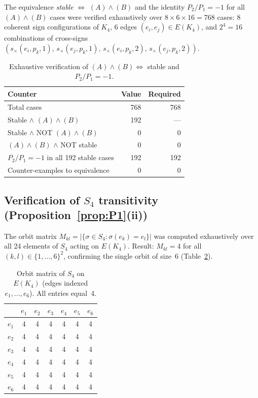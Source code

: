 \documentclass[11pt,a4paper]{article}
\theoremstyle{definition}
\begin{document}
The equivalence \emph{stable} $\iff$ $(A)\wedge(B)$ and the identity $P_2/P_1 = -1$ for all $(A)\wedge(B)$ cases were verified exhaustively over $8\times 6\times 16 = 768$ cases: 8 coherent sign configurations of $K_4$, 6 edges $(e_i,e_j)\in E(K_4)$, and $2^4 = 16$ combinations of cross-signs $(s_\times(e_i,p_k,1),\, s_\times(e_j,p_k,1),\, s_\times(e_i,p_k,2),\, s_\times(e_j,p_k,2))$.

\begin{table}[ht]
\centering
\caption{Exhaustive verification of $(A)\wedge(B)\iff$ stable and $P_2/P_1=-1$.}
\bigskip
\begin{tabular}{lrr}
\toprule
Counter & Value & Required \\
\midrule
Total cases & 768 & 768 \\
Stable $\wedge$ $(A)\wedge(B)$ & 192 & --- \\
Stable $\wedge$ NOT $(A)\wedge(B)$ & 0 & 0 \\
$(A)\wedge(B)$ $\wedge$ NOT stable & 0 & 0 \\
$P_2/P_1 = -1$ in all 192 stable cases & 192 & 192 \\
Counter-examples to equivalence & 0 & 0 \\
\bottomrule
\end{tabular}
\label{tab:AB}
\end{table}

\subsection{Verification of \texorpdfstring{$S_4$}{S4} transitivity (Proposition~\ref{prop:P1}(ii))}

The orbit matrix $M_{kl} = |\{\sigma\in S_4 : \sigma(e_k) = e_l\}|$ was computed exhaustively over all 24 elements of $S_4$ acting on $E(K_4)$. Result: $M_{kl} = 4$ for all $(k,l)\in\{1,\ldots,6\}^2$, confirming the single orbit of size~6 (Table~\ref{tab:S4}).

\begin{table}[ht]
\centering
\caption{Orbit matrix of $S_4$ on $E(K_4)$ (edges indexed $e_1,\ldots,e_6$). All entries equal~4.}
\bigskip
\begin{tabular}{ccccccc}
\toprule
& $e_1$ & $e_2$ & $e_3$ & $e_4$ & $e_5$ & $e_6$ \\
\midrule
$e_1$ & 4 & 4 & 4 & 4 & 4 & 4 \\
$e_2$ & 4 & 4 & 4 & 4 & 4 & 4 \\
$e_3$ & 4 & 4 & 4 & 4 & 4 & 4 \\
$e_4$ & 4 & 4 & 4 & 4 & 4 & 4 \\
$e_5$ & 4 & 4 & 4 & 4 & 4 & 4 \\
$e_6$ & 4 & 4 & 4 & 4 & 4 & 4 \\
\bottomrule
\end{tabular}
\label{tab:S4}
\end{table}
\end{document}

